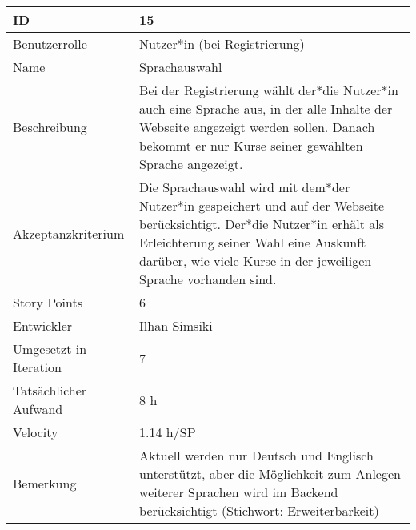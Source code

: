 \begin{tabularx}{\textwidth}{|p{}|X|}
	\hline
	ID & 15\\
	\hline
	Benutzerrolle & Nutzer*in (bei Registrierung)\\
	\hline
	Name & Sprachauswahl\\
	\hline
	Beschreibung & Bei der Registrierung wählt der*die Nutzer*in auch eine Sprache aus, in der alle Inhalte der Webseite angezeigt werden sollen. Danach bekommt er nur Kurse seiner gewählten Sprache angezeigt.\\
	\hline
	Akzeptanzkriterium & Die Sprachauswahl wird mit dem*der Nutzer*in gespeichert und auf der Webseite berücksichtigt. Der*die Nutzer*in erhält als Erleichterung seiner Wahl eine Auskunft darüber, wie viele Kurse in der jeweiligen Sprache vorhanden sind.\\
	\hline
	Story Points & 6\\
	\hline
	Entwickler & Ilhan Simsiki\\
	\hline
	Umgesetzt in Iteration & 7\\
	\hline
	Tatsächlicher Aufwand & 8 h\\
	\hline
	Velocity & 1.14 h/SP\\
	\hline
	Bemerkung & Aktuell werden nur Deutsch und Englisch unterstützt, aber die Möglichkeit zum Anlegen weiterer Sprachen wird im Backend berücksichtigt (Stichwort: Erweiterbarkeit)\\
	\hline
\end{tabularx}
\vspace{20pt}
